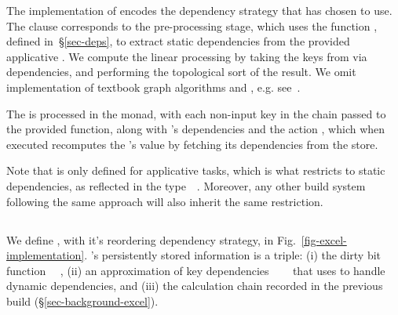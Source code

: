 The implementation of  encodes the dependency strategy that
\Make has chosen to use. The  clause corresponds to the pre-processing
stage, which uses the function , defined in~\S\ref{sec-deps},
to extract static dependencies from the provided applicative . We
compute the linear processing  by taking the keys 
from  via dependencies, and performing the topological sort of the
result. We omit implementation of textbook graph algorithms
 and , e.g.
see~\cite{cormen2001introduction}.

The  is processed in the  monad, with each non-input key
 in the chain passed to the provided  function, along with
's dependencies and the action , which when executed recomputes
the 's value by fetching its dependencies from the store.

Note that  is only defined for applicative tasks, which is what
restricts \Make to static dependencies, as reflected in the
type~~. Moreover, any other build system following
the same  approach will also inherit the same restriction.

\subsection{\Excel}\label{sec-implementation-excel}

We define \Excel, with it's reordering dependency strategy, in  Fig.~\ref{fig-excel-implementation}.
\Excel's persistently stored information is a triple: (i) the dirty bit
function ~\hs{->}~, (ii) an approximation of key dependencies
~\hs{->}~~ that \Excel uses to handle
dynamic dependencies, and (iii) the calculation chain \hs{[@@k]} recorded in the
previous build (\S\ref{sec-background-excel}).

